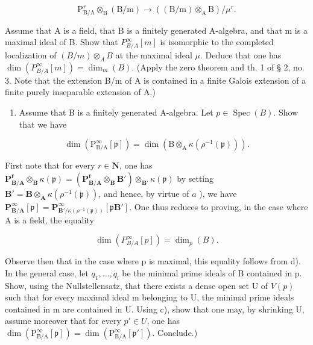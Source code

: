 \[
\mathrm{P} _ {\mathrm{B/A}} ^ {r} \otimes_ {\mathrm{B}} (\mathrm{B/m}) \rightarrow ((\mathrm{B/m}) \otimes_ {\mathrm{A}} \mathrm{B}) / \mu^ {r}.
\]

Assume that A is a field, that B is a finitely generated A-algebra, and that m is a maximal ideal of B. Show that \(P_{B/A}^{\infty}[m]\) is isomorphic to the completed localization of \((B/m)\otimes_{A}B\) at the maximal ideal \(\mu\). Deduce that one has \(\dim(P_{B/A}^{\infty}[m])=\dim_{m}(B)\). (Apply the zero theorem and th. 1 of § 2, no. 3. Note that the extension B/m of A is contained in a finite Galois extension of a finite purely inseparable extension of A.)

\begin{enumerate}
\def\labelenumi{\alph{enumi})}
\setcounter{enumi}{4}
\tightlist
\item
  Assume that B is a finitely generated A-algebra. Let \(p \in \operatorname{Spec}(B)\). Show that we have
\end{enumerate}

\[
\dim (\mathrm{P} _ {\mathrm{B/A}} ^ {\infty} [ \mathfrak {p} ]) = \dim \left(\mathrm{B} \otimes_ {\mathrm{A}} \kappa (\rho^ {- 1} (\mathfrak {p}))\right).
\]

First note that for every \(r \in \mathbf{N}\), one has \(\mathbf{P}_{\mathbf{B}/\mathbf{A}}^{\mathbf{r}} \otimes_{\mathbf{B}} \kappa(\mathfrak{p}) = (\mathbf{P}_{\mathbf{B}/\mathbf{A}}^{\mathbf{r}} \otimes_{\mathbf{B}} \mathbf{B}') \otimes_{\mathbf{B}'} \kappa(\mathfrak{p})\) by setting \(\mathbf{B}' = \mathbf{B} \otimes_{\mathbf{A}} \kappa(\rho^{-1}(\mathfrak{p}))\), and hence, by virtue of \(a\) ), we have \(\mathbf{P}_{\mathbf{B}/\mathbf{A}}^{\infty}[\mathfrak{p}] = \mathbf{P}_{\mathbf{B}' / \kappa(\rho^{-1}(\mathfrak{p}))}^{\infty}[\mathfrak{p}\mathbf{B}']\). One thus reduces to proving, in the case where A is a field, the equality

\[
\dim \left(P _ {B / A} ^ {\infty} [ p ]\right) = \dim_ {p} (B).
\]

Observe then that in the case where p is maximal, this equality follows from d). In the general case, let \(q_{1}, \ldots, q_{l}\) be the minimal prime ideals of B contained in p. Show, using the Nullstellensatz, that there exists a dense open set U of \(V(p)\) such that for every maximal ideal m belonging to U, the minimal prime ideals contained in m are contained in U. Using c), show that one may, by shrinking U, assume moreover that for every \(p' \in U\), one has \(\dim(\mathrm{P}_{\mathrm{B/A}}^{\infty}[\mathfrak{p}]) = \dim(\mathrm{P}_{\mathrm{B/A}}^{\infty}[\mathfrak{p}'])\). Conclude.)

